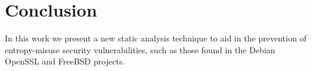 \documentclass[letterpaper,twocolumn,10pt]{article}
\begin{document}

\section{Conclusion}

In this work we present a new static analysis technique to aid in the prevention of entropy-misuse security vulnerabilities, such as those
found in the Debian OpenSSL and FreeBSD projects.





\end{document}
